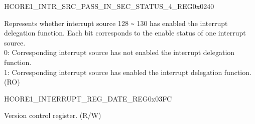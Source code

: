 \begin{register}{H}{CORE1\_INTR\_SRC\_PASS\_IN\_SEC\_STATUS\_4\_REG}{0x0240}\label{regdesc:CORE1INTRSRCPASSINSECSTATUS4REG}
%
\regnewline%
\begin{regdesc}\begin{reglist}
\label{fielddesc:CORE1INTRSRCPASSINSECSTATUS4}\item [CORE1\_INTR\_SRC\_PASS\_IN\_SEC\_STATUS\_4] Represents whether interrupt source 128 \verb+~+ 130 has enabled the interrupt delegation function. Each bit corresponds to the enable status of one interrupt source.\\
0: Corresponding interrupt source has not enabled the interrupt delegation function.\\
1: Corresponding interrupt source has enabled the interrupt delegation function.\\
(RO)
\end{reglist}\end{regdesc}
\end{register}

\begin{register}{H}{CORE1\_INTERRUPT\_REG\_DATE\_REG}{0x03FC}\label{regdesc:CORE1INTERRUPTREGDATEREG}
%
%
\regnewline%
\begin{regdesc}\begin{reglist}
\label{fielddesc:CORE1INTERRUPTREGDATE}\item [CORE1\_INTERRUPT\_REG\_DATE] Version control register. (R/W)
\end{reglist}\end{regdesc}
\end{register}

